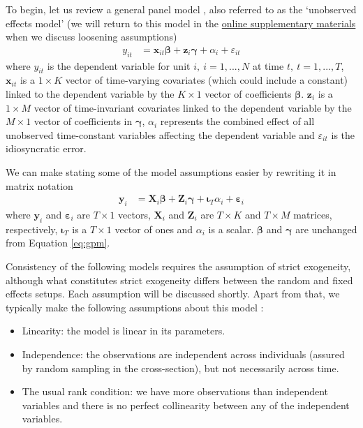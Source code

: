 \documentclass[]{interact}
\theoremstyle{plain}%
\theoremstyle{definition}
\theoremstyle{remark}
\def\tightlist{}
\begin{document}
To begin, let us review a general panel model \citep{Bollen2010}, also
referred to as the `unobserved effects model'
\citep{Wooldridge2012, R-plm_a} (we will return to this model in the
\href{https://github.com/henrik-andersen/FE-SEM/blob/master/extensions.pdf}{online
supplementary materials} when we discuss loosening assumptions)
\begin{align}
y_{it} & = \bm{x}_{it}\bm{\beta} + \bm{z}_{i}\bm{\gamma} + \alpha_{i} + \varepsilon_{it} \label{eq:gpm}
\end{align} where \(y_{it}\) is the dependent variable for unit
\(i, \ i = 1, ..., N\) at time \(t, \ t = 1, ..., T\), \(\bm{x}_{it}\)
is a \(1 \times K\) vector of time-varying covariates (which could
include a constant) linked to the dependent variable by the
\(K \times 1\) vector of coefficients \(\bm{\beta}\). \(\bm{z}_{i}\) is
a \(1 \times M\) vector of time-invariant covariates linked to the
dependent variable by the \(M \times 1\) vector of coefficients in
\(\bm{\gamma}\), \(\alpha_{i}\) represents the combined effect of all
unobserved time-constant variables affecting the dependent variable and
\(\varepsilon_{it}\) is the idiosyncratic error.

We can make stating some of the model assumptions easier by rewriting it
in matrix notation \begin{align}
\bm{y}_{i} & = \bm{X}_{i}\bm{\beta} + \bm{Z}_{i}\bm{\gamma} + \bm{\iota}_{T}\alpha_{i} + \bm{\varepsilon}_{i}
\end{align} where \(\bm{y}_{i}\) and \(\bm{\varepsilon}_{i}\) are
\(T \times 1\) vectors, \(\bm{X}_{i}\) and \(\bm{Z}_{i}\) are
\(T \times K\) and \(T \times M\) matrices, respectively,
\(\bm{\iota}_{T}\) is a \(T \times 1\) vector of ones and \(\alpha_{i}\)
is a scalar. \(\bm{\beta}\) and \(\bm{\gamma}\) are unchanged from
Equation \eqref{eq:gpm}.

Consistency of the following models requires the assumption of strict
exogeneity, although what constitutes strict exogeneity differs between
the random and fixed effects setups. Each assumption will be discussed
shortly. Apart from that, we typically make the following assumptions
about this model \citep[see, e.g.,][]{Wooldridge2002, Schmidheiny2019}:

\begin{itemize}
\tightlist
\item
  Linearity: the model is linear in its parameters.
\item
  Independence: the observations are independent across individuals
  (assured by random sampling in the cross-section), but not necessarily
  across time.
\item
  The usual rank condition: we have more observations than independent
  variables and there is no perfect collinearity between any of the
  independent variables.
\end{itemize}
\end{document}
